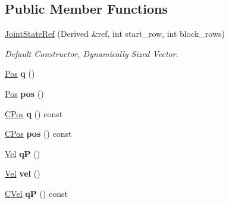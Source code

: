 \subsection*{Public Member Functions}
\begin{DoxyCompactItemize}
\item 
\hyperlink{classow__core_1_1JointStateRef_a89d90488bdd641fdc150dab34a63a9b7}{Joint\+State\+Ref} (Derived \&ref, int start\+\_\+row, int block\+\_\+rows)
\begin{DoxyCompactList}\small\item\em Default Constructor, Dynamically Sized Vector. \end{DoxyCompactList}\item 
\hyperlink{classow__core_1_1JointRef}{Pos} {\bfseries q} ()\hypertarget{classow__core_1_1JointStateRef_a23360c5c81856fe3e10b455308ac29e2}{}\label{classow__core_1_1JointStateRef_a23360c5c81856fe3e10b455308ac29e2}

\item 
\hyperlink{classow__core_1_1JointRef}{Pos} {\bfseries pos} ()\hypertarget{classow__core_1_1JointStateRef_a1f25f561b834cd479a1263713f8362dd}{}\label{classow__core_1_1JointStateRef_a1f25f561b834cd479a1263713f8362dd}

\item 
\hyperlink{classow__core_1_1JointRef}{C\+Pos} {\bfseries q} () const \hypertarget{classow__core_1_1JointStateRef_a1c05bb6f2b99dcc05cbb8f76f43626ea}{}\label{classow__core_1_1JointStateRef_a1c05bb6f2b99dcc05cbb8f76f43626ea}

\item 
\hyperlink{classow__core_1_1JointRef}{C\+Pos} {\bfseries pos} () const \hypertarget{classow__core_1_1JointStateRef_ae3463633b3b6ee08d171ed6d03f10da7}{}\label{classow__core_1_1JointStateRef_ae3463633b3b6ee08d171ed6d03f10da7}

\item 
\hyperlink{classow__core_1_1JointRef}{Vel} {\bfseries qP} ()\hypertarget{classow__core_1_1JointStateRef_a3722e00cbfad1b580c11eac3a1850273}{}\label{classow__core_1_1JointStateRef_a3722e00cbfad1b580c11eac3a1850273}

\item 
\hyperlink{classow__core_1_1JointRef}{Vel} {\bfseries vel} ()\hypertarget{classow__core_1_1JointStateRef_a261f3153fc195ede605289039a2fc99a}{}\label{classow__core_1_1JointStateRef_a261f3153fc195ede605289039a2fc99a}

\item 
\hyperlink{classow__core_1_1JointRef}{C\+Vel} {\bfseries qP} () const \hypertarget{classow__core_1_1JointStateRef_a46a372851b8897c0e48aea4d7efb8fb5}{}\label{classow__core_1_1JointStateRef_a46a372851b8897c0e48aea4d7efb8fb5}


\end{DoxyCompactItemize}
